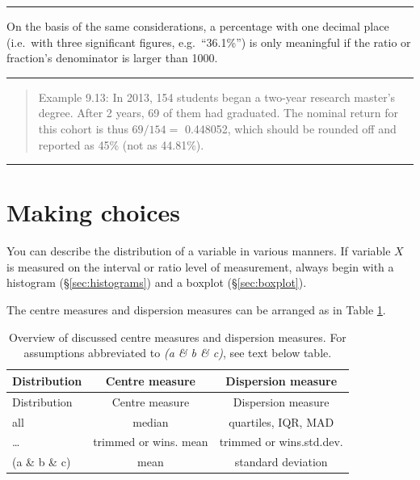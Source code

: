 \documentclass[
]{book}
\begin{document}
\begin{center}\rule{0.5\linewidth}{0.5pt}\end{center}

On the basis of the same considerations, a percentage with one decimal
place (i.e.~with three significant figures, e.g.~``36.1\%'') is only
meaningful if the ratio or fraction's denominator is larger than 1000.

\begin{center}\rule{0.5\linewidth}{0.5pt}\end{center}

\begin{quote}
Example 9.13:
In 2013, 154 students began a two-year research master's degree. After
2 years, 69 of them had graduated. The nominal return for this cohort is
thus \(69/154=\) 0.448052, which should be rounded off and reported as 45\%
(not as 44.81\%).
\end{quote}

\begin{center}\rule{0.5\linewidth}{0.5pt}\end{center}

\hypertarget{sec:robustefficient}{%
\section{Making choices}\label{sec:robustefficient}}

You can describe the distribution of a variable in various
manners.
If variable \(X\) is measured on the interval or ratio level of measurement,
always begin with a histogram (§\ref{sec:histograms})
and a boxplot (§\ref{sec:boxplot}).

The centre measures and dispersion measures can be arranged
as in Table \ref{tab:centredispersionmeasures}.

\begin{longtable}[]{@{}lcc@{}}
\caption{\label{tab:centredispersionmeasures} Overview of discussed centre measures and dispersion measures. For assumptions abbreviated to \emph{(a \& b \& c)}, see text below table.}\tabularnewline
\toprule\noalign{}
Distribution & Centre measure & Dispersion measure \\
\midrule\noalign{}
\endfirsthead
\toprule\noalign{}
Distribution & Centre measure & Dispersion measure \\
\midrule\noalign{}
\endhead
\bottomrule\noalign{}
\endlastfoot
all & median & quartiles, IQR, MAD \\
\ldots{} & trimmed or wins. mean & trimmed or wins.std.dev. \\
(a \& b \& c) & mean & standard deviation \\
\end{longtable}
\end{document}
